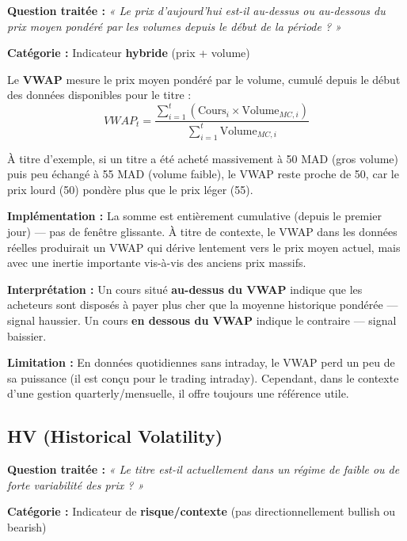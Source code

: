 \documentclass{rapportENSIAS} %
\begin{document}
\noindent
\textbf{Question traitée :} \textit{« Le prix d'aujourd'hui est-il au-dessus ou au-dessous du prix moyen pondéré par les volumes depuis le début de la période ? »}

\vspace{0.2cm}
\noindent
\textbf{Catégorie :} Indicateur \textbf{hybride} (prix + volume)

\vspace{0.2cm}
\noindent
Le \textbf{VWAP} mesure le prix moyen pondéré par le volume, cumulé depuis le début des données disponibles pour le titre :
\[
VWAP_t = \frac{\sum_{i=1}^{t} (\text{Cours}_i \times \text{Volume}_{MC,i})}{\sum_{i=1}^{t} \text{Volume}_{MC,i}}
\]

\noindent
À titre d'exemple, si un titre a été acheté massivement à 50 MAD (gros volume) puis peu échangé à 55 MAD (volume faible), le VWAP reste proche de 50, car le prix lourd (50) pondère plus que le prix léger (55).

\vspace{0.2cm}
\noindent
\textbf{Implémentation :} La somme est entièrement cumulative (depuis le premier jour) — pas de fenêtre glissante. À titre de contexte, le VWAP dans les données réelles produirait un VWAP qui dérive lentement vers le prix moyen actuel, mais avec une inertie importante vis-à-vis des anciens prix massifs.

\vspace{0.2cm}
\noindent
\textbf{Interprétation :} Un cours situé \textbf{au-dessus du VWAP} indique que les acheteurs sont disposés à payer plus cher que la moyenne historique pondérée — signal haussier. Un cours \textbf{en dessous du VWAP} indique le contraire — signal baissier.

\noindent
\textbf{Limitation :} En données quotidiennes sans intraday, le VWAP perd un peu de sa puissance (il est conçu pour le trading intraday). Cependant, dans le contexte d'une gestion quarterly/mensuelle, il offre toujours une référence utile.

\subsection{HV (Historical Volatility)}

\noindent
\textbf{Question traitée :} \textit{« Le titre est-il actuellement dans un régime de faible ou de forte variabilité des prix ? »}

\vspace{0.2cm}
\noindent
\textbf{Catégorie :} Indicateur de \textbf{risque/contexte} (pas directionnellement bullish ou bearish)
\end{document}

